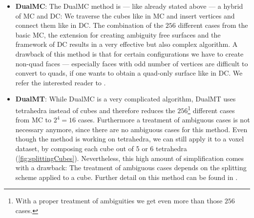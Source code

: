 \begin{itemize}
\item \textbf{\acl{DualMC}}:
The \acf{DualMC} method is --- like already stated above --- a hybrid of \ac{MC} and \ac{DC}: We traverse the cubes like in \ac{MC} and insert vertices and connect them like in \ac{DC}. The combination of the $256$ different cases from the basic \ac{MC}, the extension for creating ambiguity free surfaces and the framework of \ac{DC} results in a very effective but also complex algorithm. A drawback of this method is that for certain configurations we have to create non-\ac{quad} faces --- especially faces with odd number of vertices are difficult to convert to \acp{quad}, if one wants to obtain a \ac{quad}-only surface like in \ac{DC}. We refer the interested reader to  \cite{Nielson2004, Zhang2012}.

\item \textbf{\acl{DualMT}}:
While \ac{DualMC} is a very complicated algorithm, \acf{DualMT} uses tetrahedra instead of cubes and therefore reduces the $256$\footnote{With a proper treatment of ambiguities we get even more than those $256$ cases.} different cases from \ac{MC} to $2^4=16$ cases. Furthermore a treatment of ambiguous cases is not necessary anymore, since there are no ambiguous cases for this method.
Even though the method is working on tetrahedra, we can still apply it to a voxel dataset, by composing each cube out of 5 or 6 tetrahedra (\autoref{fig:splittingCubes}). Nevertheless, this high amount of simplification comes with a drawback: The treatment of ambiguous cases depends on the splitting scheme applied to a cube. Further detail on this method can be found in \cite{Nielson2008}.


\end{itemize}
